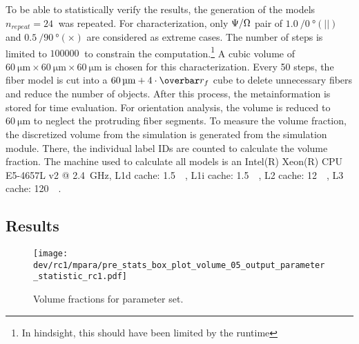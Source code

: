 %
To be able to statistically verify the results, the generation of the models $n_{\mathit{repeat}} = \SI{24}{}$ was repeated.
For characterization, only $\textnormal{$\Psi$}/\textnormal{$\Omega$}$ pair of $\SI{1.0}{}/\SI{0}{\degree}(||)$ and $\SI{0.5}{}/\SI{90}{\degree}(\times)$ are considered as extreme cases.
The number of steps is limited to $\SI{100000}{}$ to constrain the computation.\footnote{In hindsight, this should have been limited by the runtime}
A cubic volume of $\SI{60}{\micro\meter} \times \SI{60}{\micro\meter} \times \SI{60}{\micro\meter}$ is chosen for this characterization.
Every 50 steps, the fiber model is cut into a $\SI{60}{\micro\meter}+4 \cdot \fiberRadiusMean$ cube to delete unnecessary fibers and reduce the number of objects.
After this process, the metainformation is stored for time evaluation.
For orientation analysis, the volume is reduced to $\SI{60}{\micro\meter}$ to neglect the protruding fiber segments.
To measure the volume fraction, the discretized volume from the simulation is generated from the simulation module.
There, the individual label IDs are counted to calculate the volume fraction.
The machine used to calculate all models is an
Intel(R) Xeon(R) CPU E5-4657L v2 @ \SI{2.4}{\giga\hertz}, L1d cache: \SI{1.5}{\mega\byte}, L1i cache: \SI{1.5}{\mega\byte}, L2 cache: \SI{12}{\mega\byte}, L3 cache: \SI{120}{\mega\byte}.
%
%
%
\subsection{Results}
%
\begin{figure}[t]
\centering
\texttt{[image: dev/rc1/mpara/pre\_stats\_box\_plot\_volume\_05\_output\_parameter\_statistic\_rc1.pdf]}
\caption[Volume fraction]{Volume fractions for parameter set.}
\label{fig:psbp1}
\end{figure}
%
